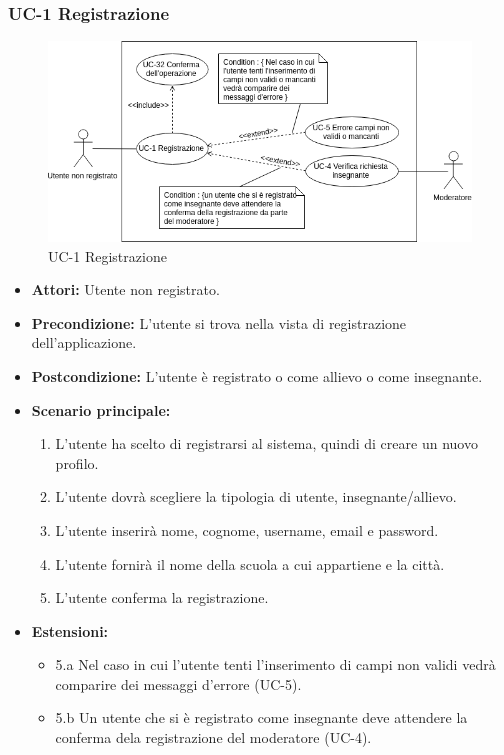 \subsubsection{UC-1 Registrazione}
\begin{figure}[h]
	\centering
	\includegraphics[scale=0.7]{images/UC-1.png}
	\caption{UC-1 Registrazione}
\end{figure}	

\begin{itemize}
		\item \textbf{Attori: }Utente non registrato.
		\item \textbf{Precondizione: }L'utente si trova nella vista di registrazione dell'applicazione.
		\item \textbf{Postcondizione: }L'utente è registrato o come allievo o come insegnante.
		\item \textbf{Scenario principale: }
		\begin{enumerate}
		\item L'utente ha scelto di registrarsi al sistema, quindi di creare un nuovo profilo. 
		\item L'utente dovrà scegliere la tipologia di utente, insegnante/allievo. 
		\item L'utente inserirà nome, cognome, username, email e password.
		\item L'utente fornirà il nome della scuola a cui appartiene e la città.
		\item L'utente conferma la registrazione.
		\end{enumerate}
		\item \textbf{Estensioni: }
		\begin{itemize}
			\item 5.a Nel caso in cui l'utente tenti l'inserimento di campi non validi vedrà comparire dei messaggi d'errore (UC-5).
			\item 5.b Un utente che si è registrato come insegnante deve attendere la conferma dela registrazione del moderatore (UC-4).
		\end{itemize}
	\end{itemize}
